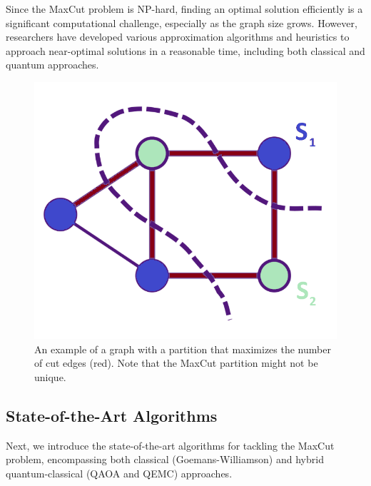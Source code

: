 Since the MaxCut problem is NP-hard, finding an optimal solution efficiently is a significant computational challenge, especially as the graph size grows. However, researchers have developed various approximation algorithms and heuristics to approach near-optimal solutions in a reasonable time, including both classical and quantum approaches. %
 

\begin{figure}[H]
  \centering
  \includegraphics[width=0.95\columnwidth]{Figures/MaxCut.png}
  \caption{An example of a graph with a partition that maximizes the number of cut edges (red). Note that the MaxCut partition might not be unique.} %
  \label{fig:MaxCut}
\end{figure}

\subsection{State-of-the-Art Algorithms}
\label{sec: SoA}
Next, we introduce the state-of-the-art algorithms for tackling the MaxCut problem, encompassing both classical (Goemans-Williamson) and hybrid quantum-classical (QAOA and QEMC) approaches.

